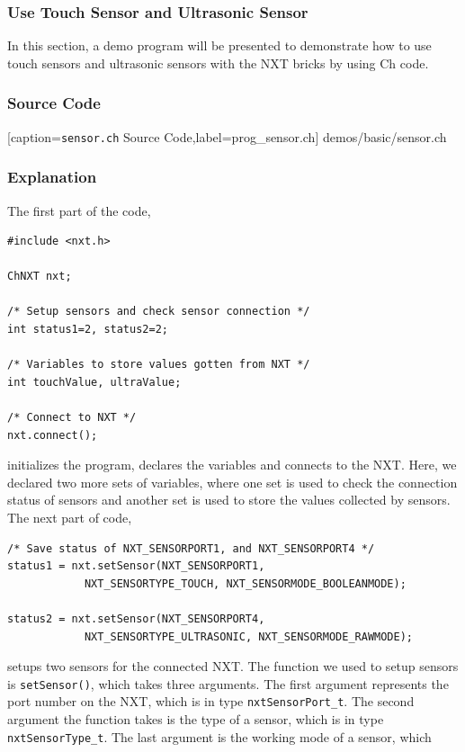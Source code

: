 \documentclass[11pt]{article}
\begin{document}
\subsubsection{Use Touch Sensor and Ultrasonic Sensor
\label{sec:sensor_touch_ultra}}
In this section, a demo program will be presented to demonstrate how to use
touch sensors and ultrasonic sensors with the NXT bricks by using Ch code.

\subsubsection*{Source Code}

    [caption={{\tt sensor.ch} Source Code},label=prog_sensor.ch]
    {demos/basic/sensor.ch}

\subsubsection*{Explanation}
The first part of the code,
\begin{lstlisting}
#include <nxt.h>

ChNXT nxt;

/* Setup sensors and check sensor connection */
int status1=2, status2=2;

/* Variables to store values gotten from NXT */
int touchValue, ultraValue;

/* Connect to NXT */
nxt.connect();
\end{lstlisting}
initializes the program, declares the variables and connects to the NXT. Here, 
we declared two more sets of variables, where one set is used to check the 
connection status of sensors and another set is used to store the values collected 
by sensors. The next part of code,
\begin{lstlisting}
/* Save status of NXT_SENSORPORT1, and NXT_SENSORPORT4 */
status1 = nxt.setSensor(NXT_SENSORPORT1, 
            NXT_SENSORTYPE_TOUCH, NXT_SENSORMODE_BOOLEANMODE);

status2 = nxt.setSensor(NXT_SENSORPORT4,
            NXT_SENSORTYPE_ULTRASONIC, NXT_SENSORMODE_RAWMODE);
\end{lstlisting}
setups two sensors for the connected NXT. The function we used to setup sensors 
is {\tt setSensor()}, which takes three arguments. The first argument represents 
the port number on the NXT, which is in type {\tt nxtSensorPort\_t}. The second 
argument the function takes is the type of a sensor, which is in type 
{\tt nxtSensorType\_t}. The last argument is the working mode of a sensor, which 
\end{document}
